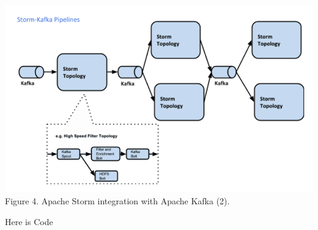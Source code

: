 \documentclass{hcmutarticle}
\begin{document}
\begin{center}
\includegraphics[scale=0.6]{image/storm-kafka-2.png}\\[0.5cm]
Figure 4. Apache Storm integration with Apache Kafka (2).
\end{center}
Here is Code\\
\end{document}
